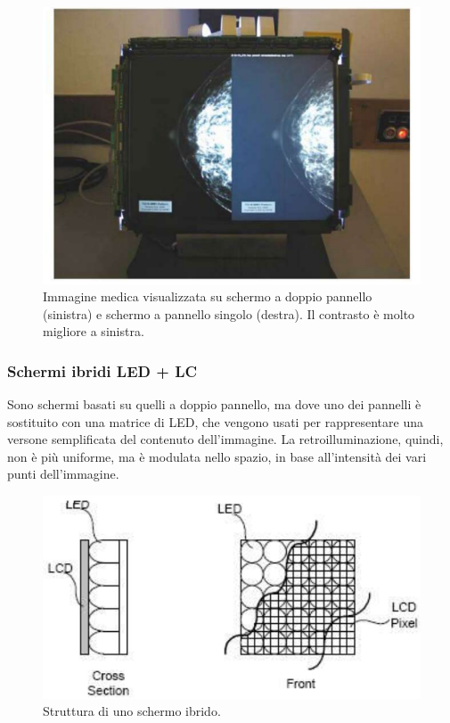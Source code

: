 \documentclass[a4paper,11pt]{article}
\begin{document}
\renewcommand{\thefigure}{4.11}
\begin{figure}[!h]
  \centering
    \includegraphics[scale=0.4]{images/4/dual_lc_example.png}
    \caption{Immagine medica visualizzata su schermo a doppio pannello (sinistra) e schermo a pannello singolo (destra). Il contrasto è molto migliore a sinistra.}
\end{figure}

\subsubsection{Schermi ibridi LED + LC}
Sono schermi basati su quelli a doppio pannello, ma dove uno dei pannelli è sostituito con una matrice
di LED, che vengono usati per rappresentare una versone semplificata del contenuto dell'immagine.
La retroilluminazione, quindi, non è più uniforme, ma è modulata nello spazio, in base all'intensità dei vari punti dell'immagine.

\renewcommand{\thefigure}{4.12}
\begin{figure}[!h]
  \centering
    \includegraphics[scale=0.4]{images/4/led_lc_structure.png}
    \caption{Struttura di uno schermo ibrido.}
\end{figure}
\end{document}
